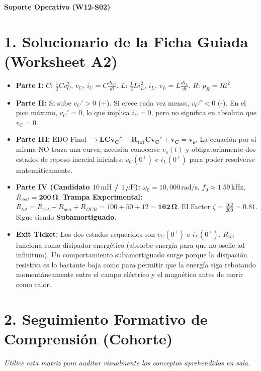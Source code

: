 \documentclass[11pt, a4paper]{article}
\begin{document}
\begin{tcolorbox}[colback=ucbblue!5!white, colframe=ucbblue, title=\textbf{Clave Docente de Auditoría RLC y Checklist Logístico}]
    \centering \textbf{Soporte Operativo (W12-S02)}
\end{tcolorbox}

\section*{1. Solucionario de la Ficha Guiada (Worksheet A2)}
\begin{itemize}
    \item \textbf{Parte I:} $C$: $\frac{1}{2}Cv_C^2$, $v_C$, $i_C = C \frac{dv_C}{dt}$. $L$: $\frac{1}{2}Li_L^2$, $i_L$, $v_L = L \frac{di_L}{dt}$. $R$: $p_R = Ri^2$.
    \item \textbf{Parte II:} Si sube $v_C' > 0$ (+). Si crece cada vez menos, $v_C'' < 0$ (-). En el pico máximo, $v_C' = 0$, lo que implica $i_C = 0$, pero no significa en absoluto que $v_C = 0$.
    \item \textbf{Parte III:} EDO Final $\to \mathbf{LC v_C'' + R_{tot}C v_C' + v_C = v_s}$. La ecuación por sí misma NO traza una curva; necesita conocerse $v_s(t)$ y obligatoriamente dos estados de reposo inercial iniciales: $v_C(0^+)$ e $i_L(0^+)$ para poder resolverse matemáticamente.
    \item \textbf{Parte IV (Candidato $10\,\text{mH}$ / $1\,\mu\text{F}$):} $\omega_0 = 10,000\,\text{rad/s}$, $f_0 \approx 1.59\,\text{kHz}$, $R_{crit} = \mathbf{200\,\Omega}$. \textbf{Trampa Experimental:} $R_{tot} = R_{ext} + R_{gen} + R_{DCR} = 100 + 50 + 12 = \mathbf{162\,\Omega}$. El Factor $\zeta = \frac{162}{200} = \mathbf{0.81}$. Sigue siendo \textbf{Subamortiguado}.
    \item \textbf{Exit Ticket:} Los dos estados requeridos son $v_C(0^+)$ e $i_L(0^+)$. $R_{tot}$ funciona como disipador energético (absorbe energía para que no oscile ad infinitum). Un comportamiento subamortiguado surge porque la disipación resistiva es lo bastante baja como para permitir que la energía siga rebotando momentáneamente entre el campo eléctrico y el magnético antes de morir como calor.
\end{itemize}

\section*{2. Seguimiento Formativo de Comprensión (Cohorte)}
\textit{Utilice esta matriz para auditar visualmente los conceptos aprehendidos en sala.}
\vspace{0.2cm}
\end{document}
